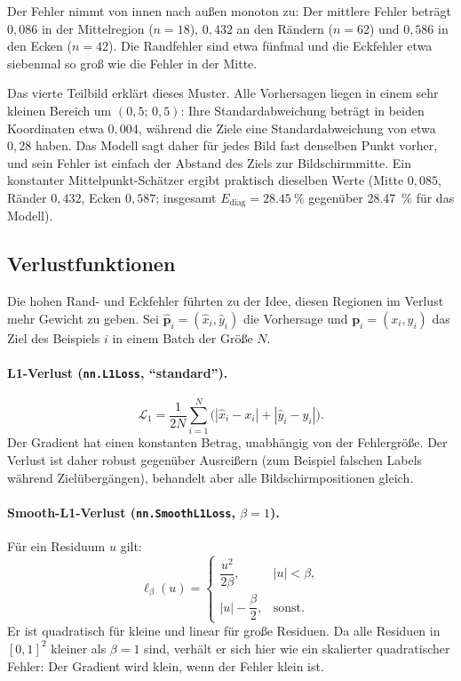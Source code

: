 \documentclass[
  11pt,
  a4paper,
  oneside,
  DIV=12,
  BCOR=8mm,
  parskip=half,
  headings=normal,
  bibliography=totoc,
  listof=totoc
]{scrreprt}
\newcommand{\code}[1]{\texttt{#1}}
\newcommand{\Ediag}{E_{\mathrm{diag}}}
\begin{document}
Der Fehler nimmt von innen nach außen monoton zu: Der mittlere Fehler beträgt
$0,086$ in der Mittelregion ($n=18$), $0,432$ an den Rändern ($n=62$) und
$0,586$ in den Ecken ($n=42$). Die Randfehler sind etwa fünfmal und die
Eckfehler etwa siebenmal so groß wie die Fehler in der Mitte.

Das vierte Teilbild erklärt dieses Muster. Alle Vorhersagen liegen in einem
sehr kleinen Bereich um $(0,5;\,0,5)$: Ihre Standardabweichung beträgt in
beiden Koordinaten etwa $0,004$, während die Ziele eine Standardabweichung
von etwa $0,28$ haben. Das Modell sagt daher für jedes Bild fast denselben
Punkt vorher, und sein Fehler ist einfach der Abstand des Ziels zur
Bildschirmmitte. Ein konstanter Mittelpunkt-Schätzer ergibt praktisch dieselben
Werte (Mitte $0,085$, Ränder $0,432$, Ecken $0,587$; insgesamt
$\Ediag=\SI{28,45}{\percent}$ gegenüber \SI{28,47}{\percent} für das Modell).

\subsection{Verlustfunktionen}
\label{sec:losses}

Die hohen Rand- und Eckfehler führten zu der Idee, diesen Regionen im Verlust
mehr Gewicht zu geben. Sei $\hat{\bm p}_i=(\hat x_i,\hat y_i)$ die Vorhersage
und $\bm p_i=(x_i,y_i)$ das Ziel des Beispiels $i$ in einem Batch der Größe
$N$.

\paragraph{L1-Verlust (\code{nn.L1Loss}, \enquote{standard}).}
\begin{equation}
  \mathcal{L}_{1} = \frac{1}{2N}\sum_{i=1}^{N}\bigl(|\hat x_i-x_i| + |\hat y_i-y_i|\bigr).
\end{equation}
Der Gradient hat einen konstanten Betrag, unabhängig von der Fehlergröße. Der
Verlust ist daher robust gegenüber Ausreißern (zum Beispiel falschen Labels
während Zielübergängen), behandelt aber alle Bildschirmpositionen gleich.

\paragraph{Smooth-L1-Verlust (\code{nn.SmoothL1Loss}, $\beta=1$).}
Für ein Residuum $u$ gilt:
\begin{equation}
  \ell_\beta(u) =
  \begin{cases}
    \dfrac{u^2}{2\beta}, & |u| < \beta,\\[1.2ex]
    |u| - \dfrac{\beta}{2}, & \text{sonst.}
  \end{cases}
\end{equation}
Er ist quadratisch für kleine und linear für große Residuen. Da alle Residuen
in $[0,1]^2$ kleiner als $\beta=1$ sind, verhält er sich hier wie ein
skalierter quadratischer Fehler: Der Gradient wird klein, wenn der Fehler
klein ist.
\end{document}

